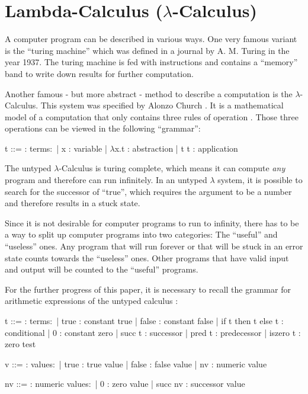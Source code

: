 \section{Lambda-Calculus ($\lambda$-Calculus)}

A computer program can be described in various
ways. One very famous variant is the ``turing machine''
which was defined in a journal \cite{aturingMachine} by
A. M. Turing in the year 1937. The turing machine
is fed with instructions and contains a ``memory'' band
to write down results for further computation.

Another famous - but more abstract - method to describe
a computation is the $\lambda$-Calculus. This system was
specified by Alonzo Church \cite{churchLambda}. It is a mathematical
model of a computation that only contains three rules
of operation \cite{pierce2002ProgLang}.
Those three operations can be viewed in the following ``grammar'':

\begin{bnfgrammar}
    t ::= : terms$\colon$
    | x : variable
    | $\lambda$x.t : abstraction
    | t t : application
\end{bnfgrammar}

The untyped $\lambda$-Calculus is turing complete,
which means it can compute \textit{any} program and
therefore can run infinitely.
In an untyped $\lambda$ system, it is possible to search
for the successor of ``true'', which
requires the argument to be a number and therefore
results in a stuck state.

Since it is not desirable for computer programs to run to infinity,
there has to be a way to split up computer programs into two categories:
The ``useful'' and ``useless'' ones. Any program that will run forever
or that will be stuck in an error state counts towards the ``useless'' ones.
Other programs that have valid input and output will be counted to the ``useful''
programs.


For the further progress of this paper, it is necessary to recall
the grammar for arithmetic expressions of the untyped calculus \cite{pierce2002ProgLang}:

\begin{bnfgrammar}
    t ::= : terms$\colon$
    | true : constant true
    | false : constant false
    | if t then t else t : conditional
    | 0 : constant zero
    | succ t : successor
    | pred t : predecessor
    | iszero t : zero test
\end{bnfgrammar}

\begin{bnfgrammar}
    v ::= : values$\colon$
    | true : true value
    | false : false value
    | nv : numeric value
\end{bnfgrammar}

\begin{bnfgrammar}
    nv ::= : numeric values$\colon$
    | 0 : zero value
    | succ nv : successor value
\end{bnfgrammar}
